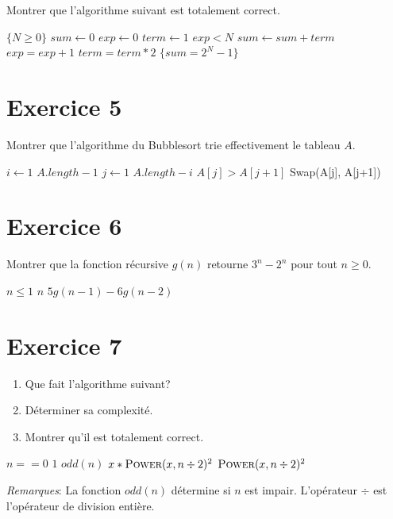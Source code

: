 \documentclass[a4paper,10pt]{article}
\begin{document}
Montrer que l'algorithme suivant est totalement correct.

\begin{codebox}
    \li \Comment $\{N\geq 0\}$
    \li $sum\gets 0$
    \li $exp\gets 0$
    \li $term\gets 1$
    \li \While $exp < N$
    \li \Do     $sum\gets sum + term$
    \li         $exp = exp + 1$
    \li         $term = term*2$
        \End
    \li \Comment $\{sum = 2^N - 1\}$
\end{codebox}
\vspace{10pt}

\section*{Exercice 5}

Montrer que l'algorithme du Bubblesort trie effectivement le tableau $A$.

\begin{codebox}
    \li \For $i\gets 1$ \To $A.length-1$
    \li \Do \For $j\gets 1$ \To $A.length-i$
    \li     \Do \If $A[j] > A[j+1]$
    \li         \Then Swap(A[j], A[j+1])
            \End
        \End
        \End
\end{codebox}
\vspace{10pt}


\section*{Exercice 6}

Montrer que la fonction récursive $g(n)$ retourne $3^n - 2^n$ pour tout $n \geq 0$.

\begin{codebox}
    \li \If $n \leq 1$
    \li \Then \Return $n$
    \li \Else
    \li \Return $5 g(n-1) - 6 g(n-2)$
        \End
\end{codebox}
\vspace{10pt}

\section*{Exercice 7}

\begin{enumerate}
\item Que fait l'algorithme suivant?
\item Déterminer sa complexité.
\item Montrer qu'il est totalement correct.
\end{enumerate}

\begin{codebox}
    \li \If $n == 0$
    \li \Then   \Return $1$
    \li \ElseIf $odd(n)$
    \li \Then   \Return $x * \textsc{Power}(x, n \div 2)^2$
    \li \Else
    \li \Return $\textsc{Power}(x, n \div 2)^2$
        \End
\end{codebox}
\vspace{10pt}

\textit{Remarques}: La fonction $odd(n)$ détermine si $n$ est impair. L'opérateur $\div$ est l'opérateur de division entière.


\end{document}
